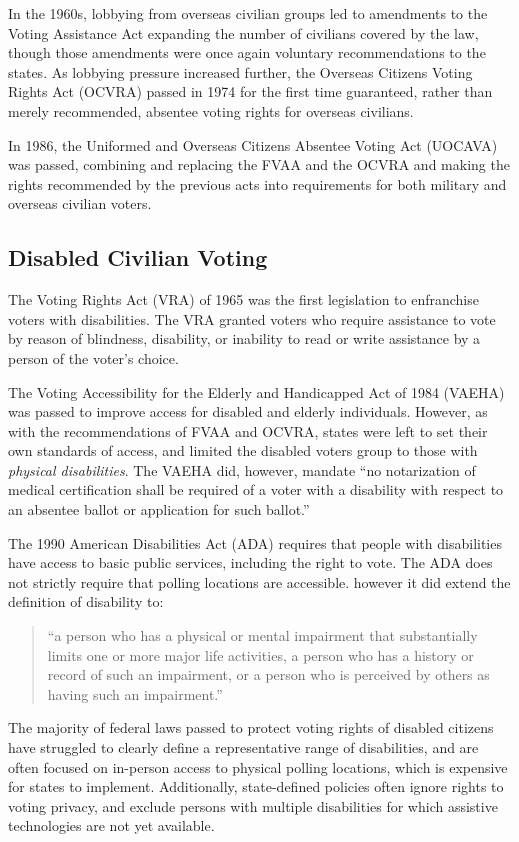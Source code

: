 In the 1960s, lobbying from overseas civilian groups led to amendments
to the Voting Assistance Act expanding the number of civilians covered
by the law, though those amendments were once again voluntary
recommendations to the states. As lobbying pressure increased further,
the Overseas Citizens Voting Rights Act (OCVRA) passed in 1974 for the first
time guaranteed, rather than merely recommended, absentee voting
rights for overseas civilians.

In 1986, the Uniformed and Overseas Citizens Absentee Voting Act
(UOCAVA) was passed, combining and replacing the FVAA and the OCVRA
and making the rights recommended by the previous acts into
requirements for both military and overseas civilian voters.

\subsection{Disabled Civilian Voting}
The Voting Rights Act (VRA) of 1965 was the first legislation to
enfranchise voters with disabilities. The VRA granted voters who
require assistance to vote by reason of blindness, disability, or
inability to read or write assistance by a person of the voter's
choice.

The Voting Accessibility for the Elderly and Handicapped Act of 1984
(VAEHA) was passed to improve access for disabled and elderly
individuals. However, as with the recommendations of FVAA and OCVRA,
states were left to set their own standards of access, and limited the
disabled voters group to those with {\em physical disabilities}. The
VAEHA did, however, mandate ``no notarization of medical certification
shall be required of a voter with a disability with respect to an
absentee ballot or application for such ballot.''

The 1990 American Disabilities Act (ADA) requires that people with
disabilities have access to basic public services, including the right
to vote. The ADA does not strictly require that polling locations are
accessible. however it did extend the definition of disability to:
\begin{quote}
``a person who has a physical or mental impairment that substantially limits
one or more major life activities, a person who has a history or record of such
an impairment, or a person who is perceived by others as having such an
impairment.''
\end{quote}

The majority of federal laws passed to protect voting rights of
disabled citizens have struggled to clearly define a representative
range of disabilities, and are often focused on in-person access to
physical polling locations, which is expensive for states to
implement. Additionally, state-defined policies often ignore rights to
voting privacy, and exclude persons with multiple disabilities for
which assistive technologies are not yet available.


